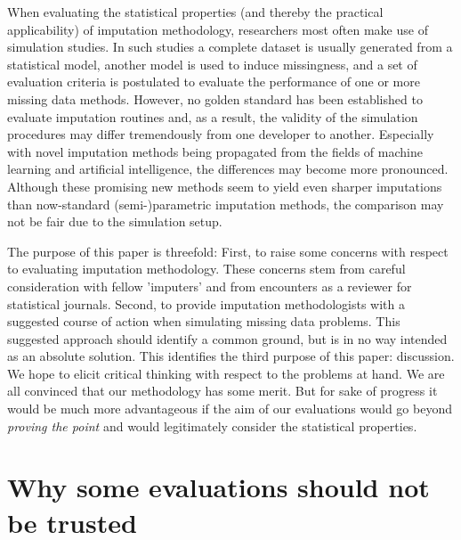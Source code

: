 \documentclass[bimj,fleqn]{w-art}
\theoremstyle{plain}
\theoremstyle{definition}
\begin{document}
When evaluating the statistical properties (and thereby the practical applicability) of imputation methodology, researchers most often make use of simulation studies. In such studies a complete dataset is usually generated from a statistical model, another model is used to induce missingness, and a set of evaluation criteria is postulated to evaluate the performance of one or more missing data methods. However, no golden standard has been established to evaluate imputation routines and, as a result, the validity of the simulation procedures may differ tremendously from one developer to another. Especially with novel imputation methods being propagated from the fields of machine learning and artificial intelligence, the differences may become more pronounced. Although these promising new methods seem to yield even sharper imputations than now-standard (semi-)parametric imputation methods, the comparison may not be fair due to the simulation setup. 


The purpose of this paper is threefold: First, to raise some concerns with respect to evaluating imputation methodology. These concerns stem from careful consideration with fellow 'imputers' and from encounters as a reviewer for statistical journals. Second, to provide imputation methodologists with a suggested course of action when simulating missing data problems. This suggested approach should identify a common ground, but is in no way intended as an absolute solution. This identifies the third purpose of this paper: discussion. We hope to elicit critical thinking with respect to the problems at hand. We are all convinced that our methodology has some merit. But for sake of progress it would be much more advantageous if the aim of our evaluations would go beyond \textit{proving the point} and would legitimately consider the statistical properties. 



\section{Why some evaluations should not be trusted}
\end{document}
